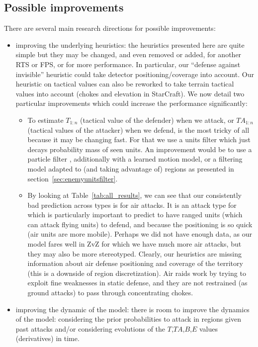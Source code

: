 \subsection{Possible improvements}
There are several main research directions for possible improvements:
\begin{itemize}
    \item improving the underlying heuristics: the heuristics presented here are quite simple but they may be changed, and even removed or added, for another RTS or FPS, or for more performance. In particular, our ``defense against invisible'' heuristic could take detector positioning/coverage into account. Our heuristic on tactical values can also be reworked to take terrain tactical values into account (chokes and elevation in StarCraft). %
We now detail two particular improvements which could increase the performance significantly:
\begin{itemize}
    \item To estimate $T_{1:n}$ (tactical value of the defender) when we attack, or $TA_{1:n}$ (tactical values of the attacker) when we defend, is the most tricky of all because it may be changing fast. For that we use a units filter which just decays probability mass of seen units. An improvement would be to use a particle filter \cite{weber2011aiide}, additionally with a learned motion model, or a filtering model adapted to (and taking advantage of) regions as presented in section~\ref{sec:enemyunitsfilter}. 
    \item By looking at Table~\ref{tab:all_results}, we can see that our consistently bad prediction across types is for air attacks. It is an attack type for which is particularly important to predict to have ranged units (which can attack flying units) to defend, and because the positioning is so quick (air units are more mobile). Perhaps we did not have enough data, as our model fares well in ZvZ for which we have much more air attacks, but they may also be more stereotyped. Clearly, our heuristics are missing information about air defense positioning and coverage of the territory (this is a downside of region discretization). Air raids work by trying to exploit fine weaknesses in static defense, and they are not restrained (as ground attacks) to pass through concentrating chokes.
\end{itemize}
    \item improving the dynamic of the model: there is room to improve the dynamics of the model: considering the prior probabilities to attack in regions given past attacks and/or considering evolutions of the $T$,$TA$,$B$,$E$ values (derivatives) in time.

\end{itemize}
